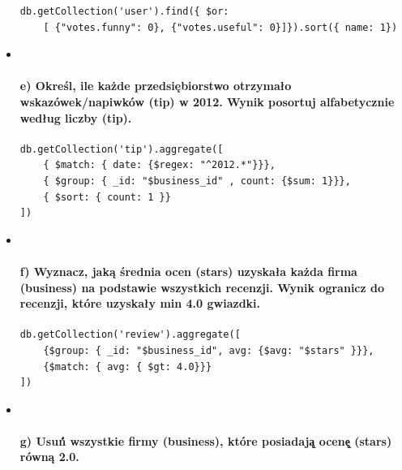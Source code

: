 \documentclass[
]{article}
\begin{document}
\begin{itemize}
\begin{verbatim}
db.getCollection('user').find({ $or: 
    [ {"votes.funny": 0}, {"votes.useful": 0}]}).sort({ name: 1})
\end{verbatim}
\item ~
  \hypertarget{e-okreux15bl-ile-kaux17cde-przedsiux119biorstwo-otrzymaux142o-wskazoweknapiwkow-tip-w-2012.-wynik-posortuj-alfabetycznie-wedux142ug-liczby-tip.}{%
  \paragraph{e) Określ, ile każde przedsiębiorstwo otrzymało
  wskazówek/napiwków (tip) w 2012. Wynik posortuj alfabetycznie według
  liczby
  (tip).}\label{e-okreux15bl-ile-kaux17cde-przedsiux119biorstwo-otrzymaux142o-wskazoweknapiwkow-tip-w-2012.-wynik-posortuj-alfabetycznie-wedux142ug-liczby-tip.}}

\begin{verbatim}
db.getCollection('tip').aggregate([
    { $match: { date: {$regex: "^2012.*"}}},
    { $group: { _id: "$business_id" , count: {$sum: 1}}},
    { $sort: { count: 1 }}
])
\end{verbatim}
\item ~
  \hypertarget{f-wyznacz-jaka-ux15brednia-ocen-stars-uzyskaux142a-kaux17cda-firma-business-na-podstawie-wszystkich-recenzji.-wynik-ogranicz-do-recenzji-ktuxf3re-uzyskaux142y-min-4.0-gwiazdki.}{%
  \paragraph{f) Wyznacz, jaką średnia ocen (stars) uzyskała każda firma
  (business) na podstawie wszystkich recenzji. Wynik ogranicz do
  recenzji, które uzyskały min 4.0
  gwiazdki.}\label{f-wyznacz-jaka-ux15brednia-ocen-stars-uzyskaux142a-kaux17cda-firma-business-na-podstawie-wszystkich-recenzji.-wynik-ogranicz-do-recenzji-ktuxf3re-uzyskaux142y-min-4.0-gwiazdki.}}

\begin{verbatim}
db.getCollection('review').aggregate([
    {$group: { _id: "$business_id", avg: {$avg: "$stars" }}},
    {$match: { avg: { $gt: 4.0}}}
])
\end{verbatim}
\item ~
  \hypertarget{g-usuux144-wszystkie-firmy-business-ktuxf3re-posiadajux105-ocenux119-stars-ruxf3wna-2.0.}{%
  \paragraph{g) Usuń́ wszystkie firmy (business), które posiadają̨ ocenę̨
  (stars) równą
  2.0.}\label{g-usuux144-wszystkie-firmy-business-ktuxf3re-posiadajux105-ocenux119-stars-ruxf3wna-2.0.}}
\end{itemize}
\end{document}
